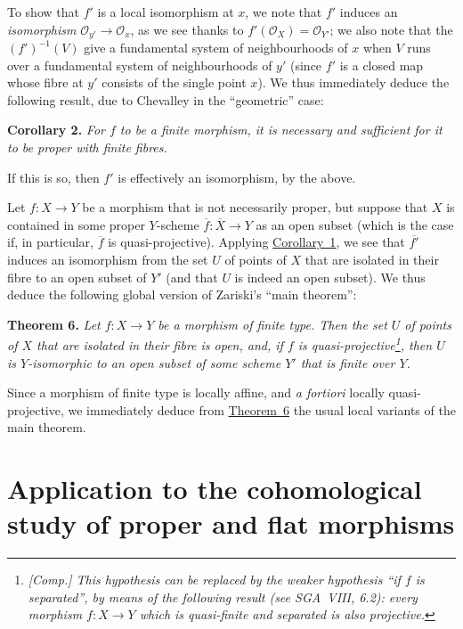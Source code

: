 \documentclass{article}
\newenvironment{itenv}[1]
  {\phantomsection\par\medskip\noindent\textbf{#1.}\itshape}
  {\medskip}
\newcommand{\scr}[1]{{\mathscr{#1}}}
\begin{document}
To show that $f'$ is a local isomorphism at $x$, we note that $f'$ induces an \emph{isomorphism} $\scr{O}_{y'}\to\scr{O}_x$, as we see thanks to $f'(\scr{O}_X)=\scr{O}_{Y'}$;
we also note that the $(f')^{-1}(V)$ give a fundamental system of neighbourhoods of $x$ when $V$ runs over a fundamental system of neighbourhoods of $y'$ (since $f'$ is a closed map whose fibre at $y'$ consists of the single point $x$).
We thus immediately deduce the following result, due to Chevalley in the ``geometric'' case:

\begin{itenv}{Corollary 2}
\label{theorem5corollary2}
  For $f$ to be a finite morphism, it is necessary and sufficient for it to be proper with finite fibres.
\end{itenv}

If this is so, then $f'$ is effectively an isomorphism, by the above.

Let $f\colon X\to Y$ be a morphism that is not necessarily proper, but suppose that $X$ is contained in some proper $Y$-scheme $\overline{f}\colon\overline{X}\to Y$ as an open subset (which is the case if, in particular, $\overline{f}$ is quasi-projective).
Applying \hyperref[theorem5corollary1]{Corollary~1}, we see that $\overline{f'}$ induces an isomorphism from the set $U$ of points of $X$ that are isolated in their fibre to an open subset of $Y'$ (and that $U$ is indeed an open subset).
We thus deduce the following global version of Zariski's ``main theorem'':

\begin{itenv}{Theorem 6}
\label{theorem6}
  Let $f\colon X\to Y$ be a morphism of finite type.
  Then the set $U$ of points of $X$ that are isolated in their fibre is open, and, if $f$ is quasi-projective\footnote{\emph{[Comp.] This hypothesis can be replaced by the weaker hypothesis ``if $f$ is separated'', by means of the following result (see SGA~VIII, 6.2): every morphism $f\colon X\to Y$ which is quasi-finite and separated is also projective.}}, then $U$ is $Y$-isomorphic to an open subset of some scheme $Y'$ that is finite over $Y$.
\end{itenv}

Since a morphism of finite type is locally affine, and \emph{a fortiori} locally quasi-projective, we immediately deduce from \hyperref[theorem6]{Theorem~6} the usual local variants of the main theorem.


\section{Application to the cohomological study of proper and flat morphisms}
\label{section5}
\end{document}
